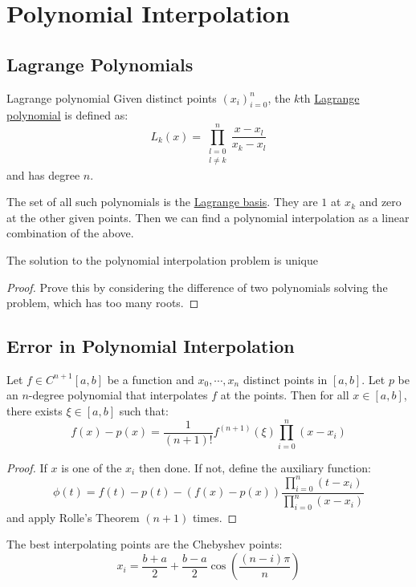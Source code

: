 \documentclass[../Main.tex]{subfiles}
\begin{document}
\section{Polynomial Interpolation}
\subsection{Lagrange Polynomials}
\begin{definition}{Lagrange polynomial}
    Given distinct points $(x_i)_{i=0}^n$, the $k$th \underline{Lagrange polynomial} is defined as:
    \begin{equation*}
        L_k(x) = \prod_{\substack{l=0\\l\neq k}}^n \frac{x - x_l}{x_k - x_l}
    \end{equation*}
    and has degree $n$.
\end{definition}
The set of all such polynomials is the \underline{Lagrange basis}. They are $1$ at $x_k$ and zero at the other given points. Then we can find a polynomial interpolation as a linear combination of the above.
\begin{proposition}
    The solution to the polynomial interpolation problem is unique
    \label{propPolyInterpUnique}
\end{proposition}
\begin{proof}
    Prove this by considering the difference of two polynomials solving the problem, which has too many roots.
\end{proof}
\subsection{Error in Polynomial Interpolation}
\begin{theorem}
    Let $f \in C^{n+1}[a, b]$ be a function and $x_0, \cdots, x_n$ distinct points in $[a, b]$. Let $p$ be an $n$-degree polynomial that interpolates $f$ at the points. Then for all $x \in [a, b]$, there exists $\xi \in [a, b]$ such that:
    \begin{equation*}
        f(x) - p(x) = \frac{1}{(n+1)!}f^{(n+1)}(\xi) \prod_{i=0}^{n} (x - x_i)
    \end{equation*}
    \label{thmPolyInterpError}
\end{theorem}
\begin{proof}
    If $x$ is one of the $x_i$ then done. If not, define the auxiliary function:
    \begin{equation*}
        \phi(t) = f(t) - p(t) - \left(f(x) - p(x)\right) \frac{\prod_{i=0}^{n}(t - x_i)}{\prod_{i=0}^{n}(x - x_i)}
    \end{equation*}
    and apply Rolle's Theorem $(n+1)$ times.
\end{proof}
The best interpolating points are the Chebyshev points:
\begin{equation*}
    x_i = \frac{b+a}{2} + \frac{b-a}{2} \cos \left(\frac{(n-i)\pi}{n}\right)
\end{equation*}
\end{document}
